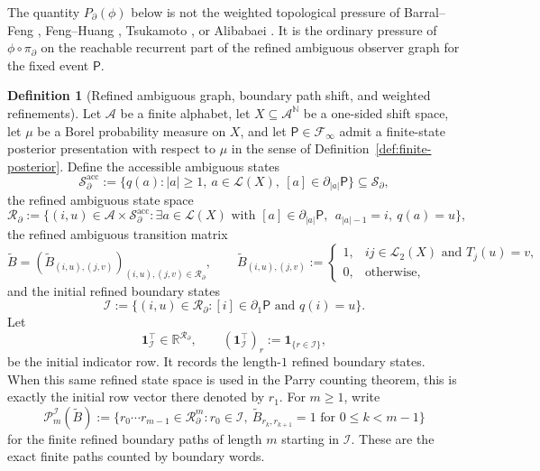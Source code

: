 \documentclass{etds}%
\numberwithin{equation}{section}
\theoremstyle{plain}
\theoremstyle{definition}
\newtheorem{definition}[theorem]{Definition}
\theoremstyle{remark}
\newcommand{\NN}{\mathbb{N}}
\begin{document}
The quantity $P_\partial(\phi)$ below is not the weighted topological pressure
of Barral--Feng \cite{BarralFeng2012WeightedThermodynamic}, Feng--Huang
\cite{FengHuang2016WeightedPressure}, Tsukamoto
\cite{Tsukamoto2023WeightedPressure}, or Alibabaei
\cite{Alibabaei2025WeightedPressure}.  It is the ordinary pressure of
$\phi\circ\pi_\partial$ on the reachable recurrent part of the refined
ambiguous observer graph for the fixed event $\mathsf{P}$.

\begin{definition}[Refined ambiguous graph, boundary path shift, and weighted refinements]
\label{def:regular-event}
Let $\mathcal{A}$ be a finite alphabet, let $X\subseteq\mathcal{A}^{\NN}$ be a
one-sided shift space, let $\mu$ be a Borel probability measure on $X$, and
let $\mathsf{P}\in\mathcal{F}_\infty$ admit a finite-state posterior
presentation with respect to $\mu$ in the sense of
Definition~\ref{def:finite-posterior}.  Define the accessible ambiguous states
\[
\mathcal{S}_\partial^{\mathrm{acc}}
:=\{q(a): |a|\ge 1,\ a\in\mathcal{L}(X),\ [a]\in\partial_{|a|}\mathsf{P}\}
\subseteq \mathcal{S}_\partial,
\]
the refined ambiguous state space
\[
\mathcal{R}_\partial
:=\{(i,u)\in\mathcal{A}\times\mathcal{S}_\partial^{\mathrm{acc}}:
\exists a\in\mathcal{L}(X)\text{ with }[a]\in\partial_{|a|}\mathsf{P},\
\ a_{|a|-1}=i,\ q(a)=u\},
\]
the refined ambiguous transition matrix
\[
\widetilde{B}
=(\widetilde{B}_{(i,u),(j,v)})_{(i,u),(j,v)\in\mathcal{R}_\partial},
\qquad
\widetilde{B}_{(i,u),(j,v)}
:=
\begin{cases}
1,& ij\in\mathcal{L}_2(X)\text{ and }T_j(u)=v,\\
0,& \text{otherwise},
\end{cases}
\]
and the initial refined boundary states
\[
\mathcal{I}
:=\{(i,u)\in\mathcal{R}_\partial:[i]\in\partial_1\mathsf{P}\text{ and }q(i)=u\}.
\]
Let
\[
\mathbf{1}_{\mathcal{I}}^{\!\top}\in\mathbb{R}^{\mathcal{R}_\partial},
\qquad
(\mathbf{1}_{\mathcal{I}}^{\!\top})_r:=\mathbf{1}_{\{r\in\mathcal{I}\}},
\]
be the initial indicator row.  It records the length-$1$ refined boundary
states.  When this same refined state space is used in the Parry counting
theorem, this is exactly the initial row vector there denoted by $r_1$.
For $m\ge 1$, write
\[
\mathcal{P}_m^{\mathcal{I}}(\widetilde{B})
:=\bigl\{r_0\cdots r_{m-1}\in\mathcal{R}_\partial^m:
r_0\in\mathcal{I},\ \widetilde{B}_{r_k,r_{k+1}}=1\text{ for }0\le k<m-1\bigr\}
\]
for the finite refined boundary paths of length $m$ starting in
$\mathcal{I}$.  These are the exact finite paths counted by boundary words.

\end{definition}
\end{document}
